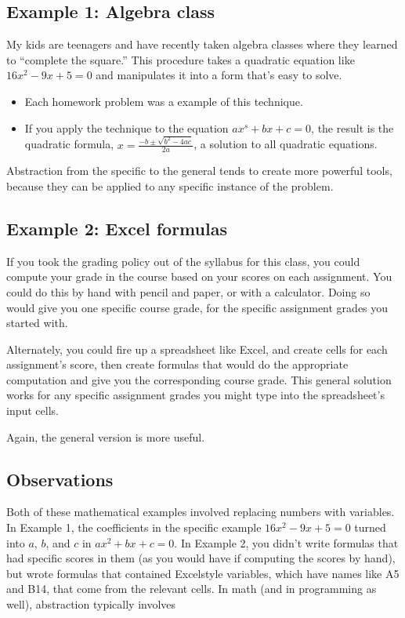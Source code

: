 \documentclass[letterpaper,10pt,english]{sphinxmanual}
\begin{document}
\subsection{Example 1: Algebra class}
\label{\detokenize{chapter-7-abstraction:example-1-algebra-class}}
My kids are teenagers and have recently taken algebra classes where they learned to “complete the square.”  This procedure takes a quadratic equation like \(16x^2-9x+5=0\) and manipulates it into a form that’s easy to solve.
\begin{itemize}
\item {} 
Each homework problem was a  example of this technique.

\item {} 
If you apply the technique to the equation \(ax^s+bx+c=0\), the result is the quadratic formula, \(x=\frac{-b\pm\sqrt{b^2-4ac}}{2a}\), a  solution to all quadratic equations.

\end{itemize}

Abstraction from the specific to the general tends to create more powerful tools, because they can be applied to any specific instance of the problem.


\subsection{Example 2: Excel formulas}
\label{\detokenize{chapter-7-abstraction:example-2-excel-formulas}}
If you took the grading policy out of the syllabus for this class, you could compute your grade in the course based on your scores on each assignment.  You could do this by hand with pencil and paper, or with a calculator.  Doing so would give you one specific course grade, for the specific assignment grades you started with.

Alternately, you could fire up a spreadsheet like Excel, and create cells for each assignment’s score, then create formulas that would do the appropriate computation and give you the corresponding course grade.  This general solution works for any specific assignment grades you might type into the spreadsheet’s input cells.

Again, the general version is more useful.


\subsection{Observations}
\label{\detokenize{chapter-7-abstraction:observations}}
Both of these mathematical examples involved replacing numbers with variables.  In Example 1, the coefficients in the specific example \(16x^2-9x+5=0\) turned into \(a\), \(b\), and \(c\) in \(ax^2+bx+c=0\).  In Example 2, you didn’t write formulas that had specific scores in them (as you would have if computing the scores by hand), but wrote formulas that contained Excel\sphinxhyphen{}style variables, which have names like A5 and B14, that come from the relevant cells.  In math (and in programming as well), abstraction typically involves 
\end{document}
